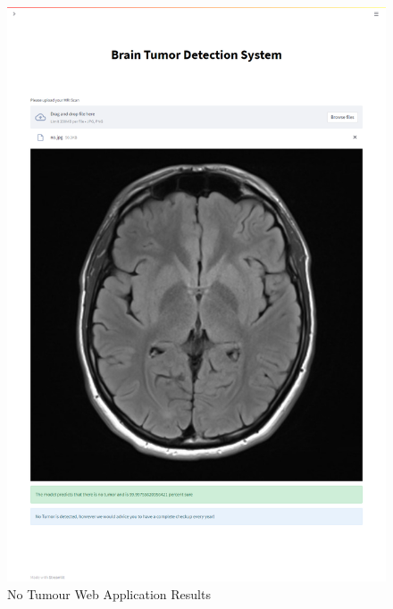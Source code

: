 \begin{itemize}
\begin{figure}[H]
        \includegraphics[scale=0.3]{Photos/Resule_no_web.png}
        \caption{No Tumour Web Application Results} \label{fig:no_tumour_res_web}
        \end{figure}   
\end{itemize}



